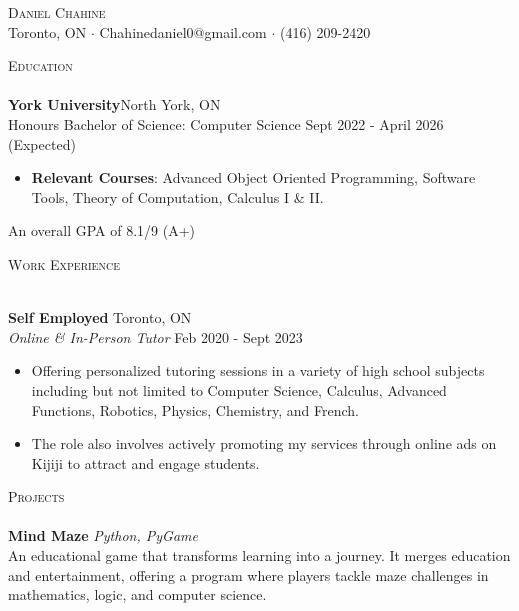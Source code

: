 \documentclass[a4paper]{article}
\newcommand{\lineunder} {
	\vspace*{-8pt} \\
	\hspace*{-18pt} \hrulefill \\
}
\newcommand{\header} [1] {
	{\hspace*{-18pt}\vspace*{6pt} \textsc{#1}}
	\vspace*{-6pt} \lineunder
}
\begin{document}
	\vspace*{-40pt}
	
	
	
	\vspace*{-10pt}
	\begin{center}
		{\Huge \scshape {Daniel Chahine}}\\
		Toronto, ON $\cdot$ Chahinedaniel0@gmail.com $\cdot$ (416) 209-2420\\
	\end{center}
	
	\header{Education}
	\textbf{York University}\hfill North York, ON\\
	Honours Bachelor of Science: Computer Science \hfill Sept 2022 - April 2026 (Expected)\\

	\begin{itemize} \itemsep 0pt
		\item \textbf{Relevant Courses}: Advanced Object Oriented Programming, Software Tools, Theory of Computation, Calculus I \& II.
	\end{itemize}
	\vspace{-2.5mm}
	\hspace{20.7pt}
	An overall GPA of 8.1/9 (A+)
	
	\vspace{3mm}
	
	\header{Work Experience}
	\vspace{1mm}
	
	\textbf{Self Employed} \hfill Toronto, ON\\
	\textit{Online \& In-Person Tutor} \hfill Feb 2020 - Sept 2023\\
	\vspace{-1mm}
	\begin{itemize} \itemsep 1pt
		\item Offering personalized tutoring sessions in a variety of high school subjects including but not limited to Computer Science, Calculus, Advanced Functions, Robotics, Physics, Chemistry, and French.
		\item The role also involves actively promoting my services through online ads on Kijiji to attract and engage students.
	\end{itemize}
	
	\vspace{-1.7mm}
	\header{Projects}

	{\textbf{Mind Maze \textbar{}}} {\sl Python, PyGame} \\
		An educational game that transforms learning into a journey. It merges education and entertainment, offering a program where players tackle maze challenges in mathematics, logic, and computer science.\\
	\vspace*{2mm}
\end{document}
